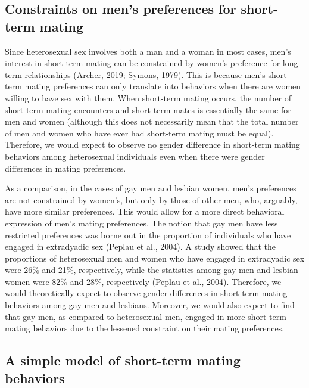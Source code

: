 \documentclass[
  11pt,
]{article}
\begin{document}
\hypertarget{constraints-on-mens-preferences-for-short-term-mating}{%
\subsection{Constraints on men's preferences for short-term
mating}\label{constraints-on-mens-preferences-for-short-term-mating}}

Since heterosexual sex involves both a man and a woman in most cases,
men's interest in short-term mating can be constrained by women's
preference for long-term relationships (Archer, 2019; Symons, 1979).
This is because men's short-term mating preferences can only translate
into behaviors when there are women willing to have sex with them. When
short-term mating occurs, the number of short-term mating encounters and
short-term mates is essentially the same for men and women (although
this does not necessarily mean that the total number of men and women
who have ever had short-term mating must be equal). Therefore, we would
expect to observe no gender difference in short-term mating behaviors
among heterosexual individuals even when there were gender differences
in mating preferences.

As a comparison, in the cases of gay men and lesbian women, men's
preferences are not constrained by women's, but only by those of other
men, who, arguably, have more similar preferences. This would allow for
a more direct behavioral expression of men's mating preferences. The
notion that gay men have less restricted preferences was borne out in
the proportion of individuals who have engaged in extradyadic sex
(Peplau et al., 2004). A study showed that the proportions of
heterosexual men and women who have engaged in extradyadic sex were 26\%
and 21\%, respectively, while the statistics among gay men and lesbian
women were 82\% and 28\%, respectively (Peplau et al., 2004). Therefore,
we would theoretically expect to observe gender differences in
short-term mating behaviors among gay men and lesbians. Moreover, we
would also expect to find that gay men, as compared to heterosexual men,
engaged in more short-term mating behaviors due to the lessened
constraint on their mating preferences.

\hypertarget{a-simple-model-of-short-term-mating-behaviors}{%
\subsection{A simple model of short-term mating
behaviors}\label{a-simple-model-of-short-term-mating-behaviors}}
\end{document}
